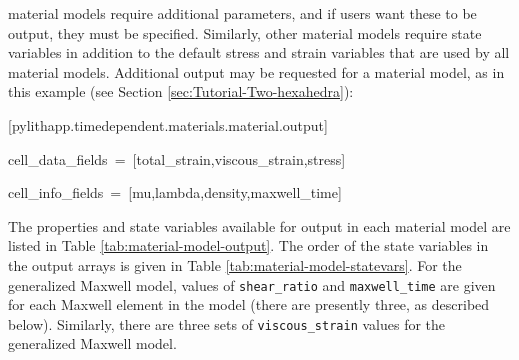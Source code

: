 material models require additional parameters, and if users want these
to be output, they must be specified. Similarly, other material models
require state variables in addition to the default stress and strain
variables that are used by all material models. Additional output
may be requested for a material model, as in this example (see Section
\ref{sec:Tutorial-Two-hexahedra}):
\begin{lyxcode}
{[}pylithapp.timedependent.materials.material.output{]}

cell\_data\_fields~=~{[}total\_strain,viscous\_strain,stress{]}

cell\_info\_fields~=~{[}mu,lambda,density,maxwell\_time{]}
\end{lyxcode}
The properties and state variables available for output in each material
model are listed in Table \ref{tab:material-model-output}. The order
of the state variables in the output arrays is given in Table \ref{tab:material-model-statevars}.
For the generalized Maxwell model, values of \texttt{shear\_ratio}
and \texttt{maxwell\_time} are given for each Maxwell element in the
model (there are presently three, as described below). Similarly,
there are three sets of \texttt{viscous\_strain} values for the generalized
Maxwell model.

